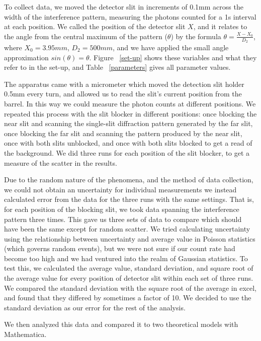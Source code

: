 \documentclass[prb,preprint]{revtex4-1}
\begin{document}
To collect data, we moved the detector slit in increments of 0.1mm across the width of the interference pattern, measuring the photons counted for a 1s interval at each position.  We called the position of the detector slit $X$, and it relates to the angle from the central maximum of the pattern ($\theta$) by the formula $\theta = \frac{X-X_0}{D_2}$, where $X_0 = 3.95mm$, $D_2 = 500mm$, and we have applied the small angle approximation $sin(\theta) = \theta$. Figure ~\ref{set-up} shows these variables and what they refer to in the set-up, and Table ~\ref{parameters} gives all parameter values. 

The apparatus came with a micrometer which moved the detection slit holder 0.5mm every turn, and allowed us to read the slit's current position from the barrel.  In this way we could measure the photon counts at different positions.  We repeated this process with the slit blocker in different positions: once blocking the near slit and scanning the single-slit diffraction pattern generated by the far slit, once blocking the far slit and scanning the pattern produced by the near slit, once with both slits unblocked, and once with both slits blocked to get a read of the background.  We did three runs for each position of the slit blocker, to get a measure of the scatter in the results.  

Due to the random nature of the phenomena, and the method of data collection, we could not obtain an uncertainty for individual measurements we instead calculated error from the data for the three runs with the same settings. That is, for each position of the blocking slit, we took data spanning the interference pattern three times.  This gave us three sets of data to compare which should have been the same except for random scatter.  We tried calculating uncertainty using the relationship between uncertainty and average value in Poisson statistics (which governs random events), but we were not sure if our count rate had become too high and we had ventured into the realm of Gaussian statistics.  To test this, we calculated the average value, standard deviation, and square root of the average value for every position of detector slit within each set of three runs.  We compared the standard deviation with the square root of the average in excel, and found that they differed by sometimes a factor of 10.  We decided to use the standard deviation as our error for the rest of the analysis.  

We then analyzed this data and compared it to two theoretical models with Mathematica.  
\end{document}
